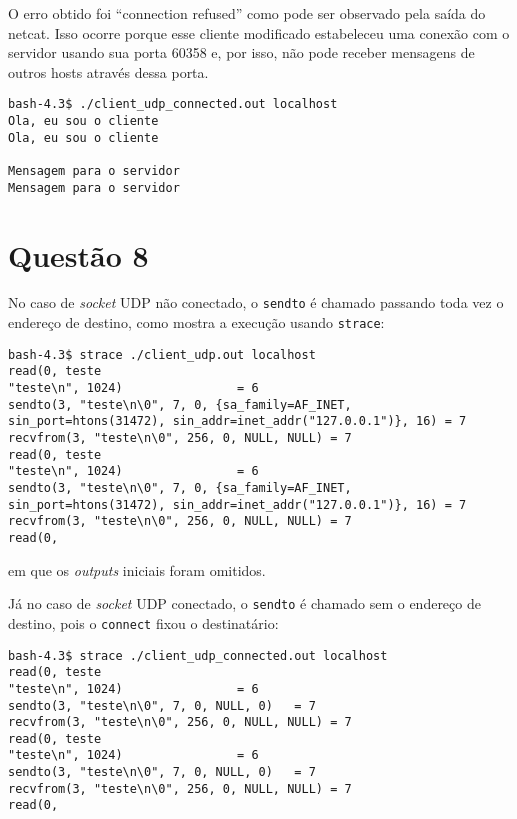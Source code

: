 \documentclass[a4paper,10pt]{article}
\begin{document}
O erro obtido foi ``connection refused'' como pode ser observado pela saída do netcat. Isso ocorre porque esse cliente modificado estabeleceu uma conexão com o servidor usando sua porta 60358 e, por isso, não pode receber mensagens de outros hosts através dessa porta.

\begin{lstlisting}
bash-4.3$ ./client_udp_connected.out localhost
Ola, eu sou o cliente
Ola, eu sou o cliente

Mensagem para o servidor
Mensagem para o servidor
\end{lstlisting}

\section{Questão 8}
No caso de \textit{socket} UDP não conectado, o {\tt sendto} é chamado passando toda vez o endereço de destino, como mostra a execução usando {\tt strace}:

\begin{lstlisting}
bash-4.3$ strace ./client_udp.out localhost
read(0, teste
"teste\n", 1024)                = 6
sendto(3, "teste\n\0", 7, 0, {sa_family=AF_INET, sin_port=htons(31472), sin_addr=inet_addr("127.0.0.1")}, 16) = 7
recvfrom(3, "teste\n\0", 256, 0, NULL, NULL) = 7
read(0, teste
"teste\n", 1024)                = 6
sendto(3, "teste\n\0", 7, 0, {sa_family=AF_INET, sin_port=htons(31472), sin_addr=inet_addr("127.0.0.1")}, 16) = 7
recvfrom(3, "teste\n\0", 256, 0, NULL, NULL) = 7
read(0, 

\end{lstlisting}

em que os \textit{outputs} iniciais foram omitidos.

Já no caso de \textit{socket} UDP conectado, o {\tt sendto} é chamado sem o endereço de destino, pois o {\tt connect} fixou o destinatário:

\begin{lstlisting}
bash-4.3$ strace ./client_udp_connected.out localhost
read(0, teste
"teste\n", 1024)                = 6
sendto(3, "teste\n\0", 7, 0, NULL, 0)   = 7
recvfrom(3, "teste\n\0", 256, 0, NULL, NULL) = 7
read(0, teste
"teste\n", 1024)                = 6
sendto(3, "teste\n\0", 7, 0, NULL, 0)   = 7
recvfrom(3, "teste\n\0", 256, 0, NULL, NULL) = 7
read(0, 

\end{lstlisting}
\end{document}
